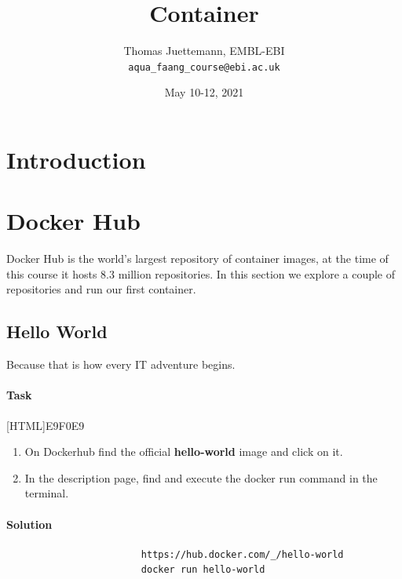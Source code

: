 \documentclass[12pt]{article}
\begin{document}
	
	\title{Container} 
	\author{Thomas Juettemann, EMBL-EBI\\
	\texttt{aqua\_faang\_course@ebi.ac.uk}}  %
	\date{May 10-12, 2021}  %
	\maketitle
	
	
	\section{Introduction}
	
	\section{Docker Hub}
	Docker Hub is the world’s largest repository of container images, at the time of this course it hosts 8.3 million repositories. 
	In this section we explore a couple of repositories and run our first container.
	
		\subsection{Hello World}
			Because that is how every IT adventure begins.
			
			
			\paragraph{Task}
				[HTML]{E9F0E9}{\parbox{\linewidth}{%
						\begin{enumerate}
							\item On Dockerhub find the official  \textbf{hello-world} image and click on it.
							\item In the description page, find and execute the docker run command in the terminal.
						\end{enumerate}
				}}
			
			\paragraph{Solution}
				
				\begin{minipage}{\linewidth}
					\begin{lstlisting}
						https://hub.docker.com/_/hello-world
						docker run hello-world
					\end{lstlisting}
				\end{minipage}
	
\end{document}
